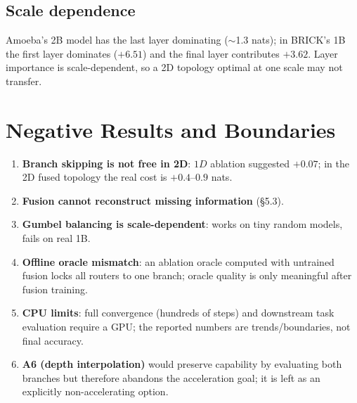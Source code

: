 \documentclass[11pt,a4paper]{article}
\begin{document}
\subsection{Scale dependence}
Amoeba's 2B model has the last layer dominating ($\sim$1.3 nats); in BRICK's 1B the
first layer dominates ($+6.51$) and the final layer contributes $+3.62$. Layer
importance is scale-dependent, so a 2D topology optimal at one scale may not transfer.

\section{Negative Results and Boundaries}
\begin{enumerate}[leftmargin=*]
  \item \textbf{Branch skipping is not free in 2D}: $1D$ ablation suggested $+0.07$;
        in the 2D fused topology the real cost is $+0.4$--$0.9$ nats.
  \item \textbf{Fusion cannot reconstruct missing information} (\S5.3).
  \item \textbf{Gumbel balancing is scale-dependent}: works on tiny random models,
        fails on real 1B.
  \item \textbf{Offline oracle mismatch}: an ablation oracle computed with untrained
        fusion locks all routers to one branch; oracle quality is only meaningful after
        fusion training.
  \item \textbf{CPU limits}: full convergence (hundreds of steps) and downstream task
        evaluation require a GPU; the reported numbers are trends/boundaries, not
        final accuracy.
  \item \textbf{A6 (depth interpolation)} would preserve capability by evaluating
        both branches but therefore abandons the acceleration goal; it is left as an
        explicitly non-accelerating option.
\end{enumerate}
\end{document}
